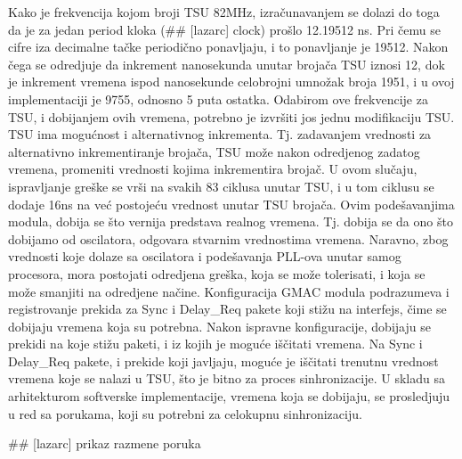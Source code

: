 \documentclass[a4paper,12pt, master]{etf}
\begin{document}
        Kako je frekvencija kojom broji TSU 82MHz, izra\v{c}unavanjem se dolazi
        do toga da je za jedan period kloka (\#\# [lazarc] clock) pro\v{s}lo
        12.19512 ns. Pri \v{c}emu se cifre iza decimalne ta\v{c}ke
        periodi\v{c}no ponavljaju, i to ponavljanje je 19512. Nakon \v{c}ega se
        odredjuje da inkrement nanosekunda unutar broja\v{c}a TSU iznosi 12,
        dok je inkrement vremena ispod nanosekunde celobrojni umno\v{z}ak broja
        1951, i u ovoj implementaciji je 9755, odnosno 5 puta ostatka. Odabirom
        ove frekvencije za TSU, i dobijanjem ovih vremena, potrebno je
        izvr\v{s}iti jos jednu modifikaciju TSU\@. TSU ima mogu\'{c}nost i
        alternativnog inkrementa. Tj\@. zadavanjem vrednosti za alternativno
        inkrementiranje broja\v{c}a, TSU mo\v{z}e nakon odredjenog zadatog
        vremena, promeniti vrednosti kojima inkrementira broja\v{c}. U ovom
        slu\v{c}aju, ispravljanje gre\v{s}ke se vr\v{s}i na svakih 83 ciklusa
        unutar TSU, i u tom ciklusu se dodaje 16ns na ve\'{c} postoje\'{c}u
        vrednost unutar TSU broja\v{c}a. Ovim pode\v{s}avanjima modula, dobija
        se \v{s}to vernija predstava realnog vremena. Tj\@. dobija se da ono
        \v{s}to dobijamo od oscilatora, odgovara stvarnim vrednostima vremena.
        Naravno, zbog vrednosti koje dolaze sa oscilatora i pode\v{s}avanja
        PLL-ova unutar samog procesora, mora postojati odredjena gre\v{s}ka,
        koja se mo\v{z}e tolerisati, i koja se mo\v{z}e smanjiti na odredjene
        na\v{c}ine. Konfiguracija GMAC modula podrazumeva i registrovanje
        prekida za Sync i Delay\_Req pakete koji sti\v{z}u na interfejs,
        \v{c}ime se dobijaju vremena koja su potrebna. Nakon ispravne
        konfiguracije, dobijaju se prekidi na koje sti\v{z}u paketi, i iz kojih
        je mogu\'{c}e i\v{s}\v{c}itati vremena. Na Sync i Delay\_Req pakete, i
        prekide koji javljaju, mogu\'{c}e je i\v{s}\v{c}itati trenutnu vrednost
        vremena koje se nalazi u TSU, \v{s}to je bitno za proces
        sinhronizacije. U skladu sa arhitekturom softverske implementacije,
        vremena koja se dobijaju, se prosledjuju u red sa porukama, koji su
        potrebni za celokupnu sinhronizaciju.

        \#\# [lazarc] prikaz razmene poruka
\end{document}
